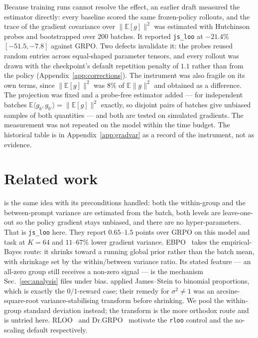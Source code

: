 \documentclass{article}
\newcommand{\E}{\mathbb{E}}
\newcommand{\arm}[1]{\texttt{#1}}
\begin{document}
Because training runs cannot resolve the effect, an earlier draft measured
the estimator directly: every baseline scored the same frozen-policy
rollouts, and the trace of the gradient covariance over $\lVert\E[g]\rVert^2$
was estimated with Hutchinson probes and bootstrapped over 200 batches. It
reported \arm{js\_loo} at $-21.4\%$ $[-51.5,-7.8]$ against GRPO. Two
defects invalidate it: the probes reused random entries across equal-shaped
parameter tensors, and every rollout was drawn with the checkpoint's
default repetition penalty of $1.1$ rather than from the policy
(Appendix~\ref{app:corrections}). The instrument was also fragile on its
own terms, since $\lVert\E[g]\rVert^2$ was $8\%$ of $\E\lVert g\rVert^2$ and
obtained as a difference. The projection was fixed and a probe-free
estimator added --- for independent batches
$\E\langle g_b,g_{b'}\rangle=\lVert\E[g]\rVert^2$ exactly, so disjoint pairs
of batches give unbiased samples of both quantities --- and both are tested
on simulated gradients. The measurement was not repeated on the model
within the time budget. The historical table is in
Appendix~\ref{app:gradvar} as a record of the instrument, not as evidence.

\section{Related work}

\citet{zeng2025shrinking} is the same idea with its preconditions handled:
both the within-group and the between-prompt variance are estimated from
the batch, both levels are leave-one-out so the policy gradient stays
unbiased, and there are no hyper-parameters. That is \arm{js\_loo} here.
They report $0.65$--$1.5$ points over GRPO on this model and task at $K=64$
and $11$--$67\%$ lower gradient variance. EBPO~\citep{han2026ebpo} takes the
empirical-Bayes route: it shrinks toward a running global prior rather than
the batch mean, with shrinkage set by the within/between variance ratio.
Its stated feature --- an all-zero group still receives a non-zero signal
--- is the mechanism Sec.~\ref{sec:analysis} files under bias.
\citet{efron1975} applied James--Stein to binomial proportions, which is
exactly the $0/1$-reward case; their remedy for $\sigma^2\ne1$ was an
arcsine-square-root variance-stabilising transform before shrinking. We
pool the within-group standard deviation instead; the transform is the
more orthodox route and is untried here. RLOO~\citep{ahmadian2024rloo} and
Dr.GRPO~\citep{liu2025drgrpo} motivate the \arm{rloo} control and the
no-scaling default respectively.
\end{document}
